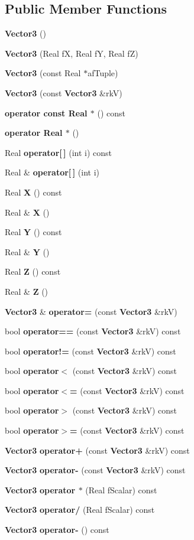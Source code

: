 \subsection*{Public Member Functions}
\begin{CompactItemize}
\item 
{\bf Vector3} ()
\item 
{\bf Vector3} (Real f\-X, Real f\-Y, Real f\-Z)
\item 
{\bf Vector3} (const Real $\ast$af\-Tuple)
\item 
{\bf Vector3} (const {\bf Vector3} \&rk\-V)
\item 
{\bf operator const Real $\ast$} () const
\item 
{\bf operator Real $\ast$} ()
\item 
Real {\bf operator[$\,$]} (int i) const
\item 
Real \& {\bf operator[$\,$]} (int i)
\item 
Real {\bf X} () const
\item 
Real \& {\bf X} ()
\item 
Real {\bf Y} () const
\item 
Real \& {\bf Y} ()
\item 
Real {\bf Z} () const
\item 
Real \& {\bf Z} ()
\item 
{\bf Vector3} \& {\bf operator=} (const {\bf Vector3} \&rk\-V)
\item 
bool {\bf operator==} (const {\bf Vector3} \&rk\-V) const
\item 
bool {\bf operator!=} (const {\bf Vector3} \&rk\-V) const
\item 
bool {\bf operator$<$} (const {\bf Vector3} \&rk\-V) const
\item 
bool {\bf operator$<$=} (const {\bf Vector3} \&rk\-V) const
\item 
bool {\bf operator$>$} (const {\bf Vector3} \&rk\-V) const
\item 
bool {\bf operator$>$=} (const {\bf Vector3} \&rk\-V) const
\item 
{\bf Vector3} {\bf operator+} (const {\bf Vector3} \&rk\-V) const
\item 
{\bf Vector3} {\bf operator-} (const {\bf Vector3} \&rk\-V) const
\item 
{\bf Vector3} {\bf operator $\ast$} (Real f\-Scalar) const 
\item 
{\bf Vector3} {\bf operator/} (Real f\-Scalar) const 
\item 
{\bf Vector3} {\bf operator-} () const

\end{CompactItemize}
